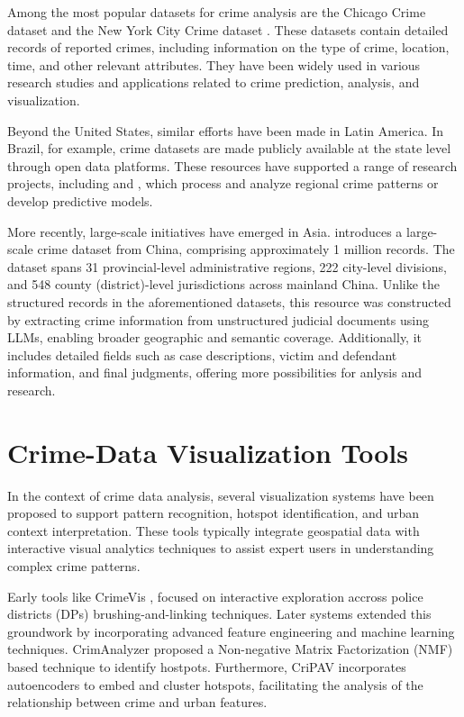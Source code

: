 Among the most popular datasets for crime analysis are the Chicago Crime dataset \cite{ChicagoDataset} and the New York City Crime dataset \cite{NYCDataset}. These datasets contain detailed records of reported crimes, including information on the type of crime, location, time, and other relevant attributes. They have been widely used in various research studies and applications related to crime prediction, analysis, and visualization.

Beyond the United States, similar efforts have been made in Latin America. In Brazil, for example, crime datasets are made publicly available at the state level through open data platforms. These resources have supported a range of research projects, including \cite{Garcia2022CriPAV} and \cite{Waqar2025CrimePredictionGNN}, which process and analyze regional crime patterns or develop predictive models.

More recently, large-scale initiatives have emerged in Asia. \cite{Zhang2025CrimeDatasetChina} introduces a large-scale crime dataset from China, comprising approximately 1 million records. The dataset spans 31 provincial-level administrative regions, 222 city-level divisions, and 548 county (district)-level jurisdictions across mainland China. Unlike the structured records in the aforementioned datasets, this resource was constructed by extracting crime information from unstructured judicial documents using LLMs, enabling broader geographic and semantic coverage. Additionally, it includes detailed fields such as case descriptions, victim and defendant information, and final judgments, offering more possibilities for anlysis and research.



\section{Crime-Data Visualization Tools}

In the context of crime data analysis, several visualization systems have been proposed to support pattern recognition, hotspot identification, and urban context interpretation. These tools typically integrate geospatial data with interactive visual analytics techniques to assist expert users in understanding complex crime patterns.

Early tools like CrimeVis \cite{Silva2017CrimeVisAI}, focused on interactive exploration accross police districts (DPs) brushing-and-linking techniques. Later systems extended this groundwork by incorporating advanced feature engineering and machine learning techniques. CrimAnalyzer \cite{Garcia2021CrimAnalyzer} proposed a Non-negative Matrix Factorization (NMF) based technique to identify hostpots. Furthermore, CriPAV \cite{Garcia2022CriPAV} incorporates autoencoders to embed and cluster hotspots, facilitating the analysis of the relationship between crime and urban features.


